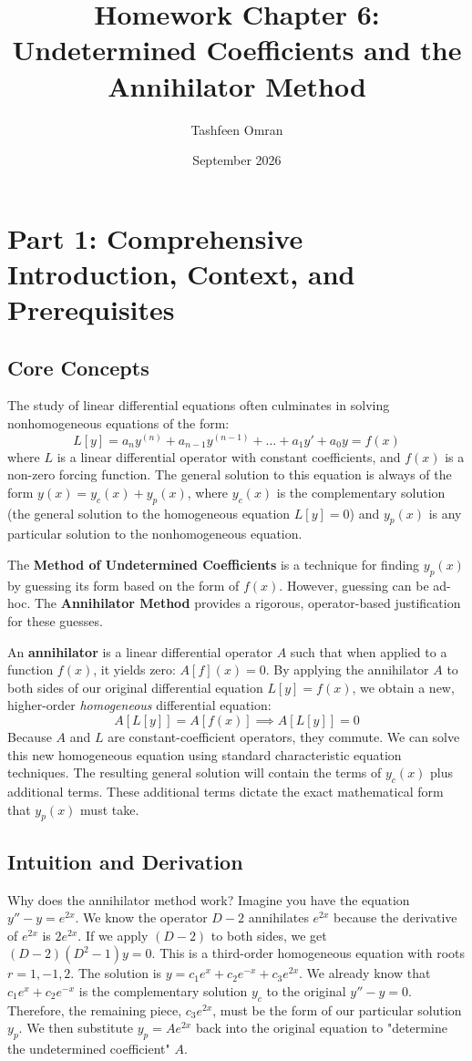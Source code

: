 \documentclass[11pt]{article}
\title{\textbf{Homework Chapter 6: Undetermined Coefficients and the Annihilator Method}}
\author{Tashfeen Omran}
\date{September 2026}
\begin{document}
\maketitle
\tableofcontents
\newpage

\section{Part 1: Comprehensive Introduction, Context, and Prerequisites}

\subsection{Core Concepts}
The study of linear differential equations often culminates in solving nonhomogeneous equations of the form:
\[ L[y] = a_n y^{(n)} + a_{n-1} y^{(n-1)} + \dots + a_1 y' + a_0 y = f(x) \]
where $L$ is a linear differential operator with constant coefficients, and $f(x)$ is a non-zero forcing function. The general solution to this equation is always of the form $y(x) = y_c(x) + y_p(x)$, where $y_c(x)$ is the complementary solution (the general solution to the homogeneous equation $L[y] = 0$) and $y_p(x)$ is any particular solution to the nonhomogeneous equation.

The \textbf{Method of Undetermined Coefficients} is a technique for finding $y_p(x)$ by guessing its form based on the form of $f(x)$. However, guessing can be ad-hoc. The \textbf{Annihilator Method} provides a rigorous, operator-based justification for these guesses. 

An \textbf{annihilator} is a linear differential operator $A$ such that when applied to a function $f(x)$, it yields zero: $A[f](x) = 0$. By applying the annihilator $A$ to both sides of our original differential equation $L[y] = f(x)$, we obtain a new, higher-order \textit{homogeneous} differential equation:
\[ A[L[y]] = A[f(x)] \implies A[L[y]] = 0 \]
Because $A$ and $L$ are constant-coefficient operators, they commute. We can solve this new homogeneous equation using standard characteristic equation techniques. The resulting general solution will contain the terms of $y_c(x)$ plus additional terms. These additional terms dictate the exact mathematical form that $y_p(x)$ must take.

\subsection{Intuition and Derivation}
Why does the annihilator method work? Imagine you have the equation $y'' - y = e^{2x}$. We know the operator $D - 2$ annihilates $e^{2x}$ because the derivative of $e^{2x}$ is $2e^{2x}$. If we apply $(D - 2)$ to both sides, we get $(D - 2)(D^2 - 1)y = 0$. 
This is a third-order homogeneous equation with roots $r = 1, -1, 2$. The solution is $y = c_1 e^x + c_2 e^{-x} + c_3 e^{2x}$. 
We already know that $c_1 e^x + c_2 e^{-x}$ is the complementary solution $y_c$ to the original $y'' - y = 0$. Therefore, the remaining piece, $c_3 e^{2x}$, must be the form of our particular solution $y_p$. We then substitute $y_p = A e^{2x}$ back into the original equation to "determine the undetermined coefficient" $A$.
\end{document}
